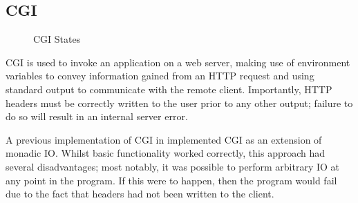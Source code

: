 \documentclass[preprint]{sigplanconf}
\begin{document}
\subsection{CGI}
\begin{figure}[htpb!]
\centering
{}
\caption{CGI States}
\label{fig:cgistates}
\end{figure}

CGI is used to invoke an application on a web server, making use of environment variables to convey information gained from an HTTP request and using standard output to communicate with the remote client. Importantly, HTTP headers must be correctly written to the user prior to any other output; failure to do so will result in an internal server error.

A previous implementation of CGI in \idris{} implemented CGI as an extension of monadic IO. Whilst basic functionality worked correctly, this approach had several disadvantages; most notably, it was possible to perform arbitrary IO at any point in the program. If this were to happen, then the program would fail due to the fact that headers had not been written to the client.
\end{document}
